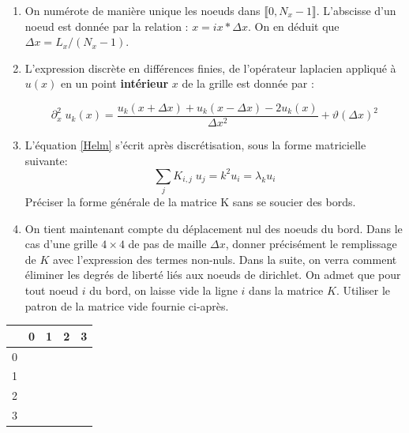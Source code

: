 \documentclass[a4paper, 12pt]{article}
\begin{document}
\begin{enumerate} 
 \item  On numérote de manière unique les noeuds dans $\llbracket 0, N_x-1  \rrbracket$. 
 L'abscisse d'un noeud est donnée par la relation : $x = ix*\Delta x$.
On en déduit que $\Delta x = L_x /(N_x-1)$.
    
 \item L'expression discrète en différences finies, de l'opérateur laplacien appliqué à $u(x)$ 
 en un point {\bf intérieur} $x$ de la grille est donnée par :

  \begin{equation}
 \partial_x^2 \; u_k (x)= \frac{ u_k(x+\Delta x)+ u_k(x-\Delta x)-2 u_k(x)}{\Delta x^2}
 +\vartheta(\Delta x)^2
\end{equation}


\item L'équation  \eqref{Helm}  s'écrit après discrétisation, sous la forme matricielle suivante:
\begin{equation}
\sum_j K_{i, j} \; u_j = k^2 u_i = \lambda_k u_i
\label{HelmDis}
\end{equation}
Préciser la forme générale de la matrice K sans se soucier des bords.

\item On tient maintenant compte du déplacement nul des noeuds du bord.
Dans le cas d'une grille $4 \times 4$ de pas de maille $\Delta x$, donner
précisément le remplissage de $K$ avec l'expression des termes non-nuls. 
Dans la suite, on verra comment éliminer les degrés de liberté liés aux noeuds de dirichlet.
On admet que pour tout noeud ${i}$ du bord, on laisse vide la ligne  ${i}$ dans la matrice $K$.
Utiliser le patron de la matrice vide fournie ci-après.

\end{enumerate} 

\begin{center}
   \begin{tabular}{| c | c | c | c | c  |}
     \hline
        & 0  & 1 & 2 &  3  \\ \hline
     0 &     &    &    &      \\ \hline
     1 &     &    &    &      \\ \hline
     2 &     &    &    &      \\ \hline
     3 &     &    &    &      \\ \hline
   \end{tabular}
 \end{center}
 
\end{document}
